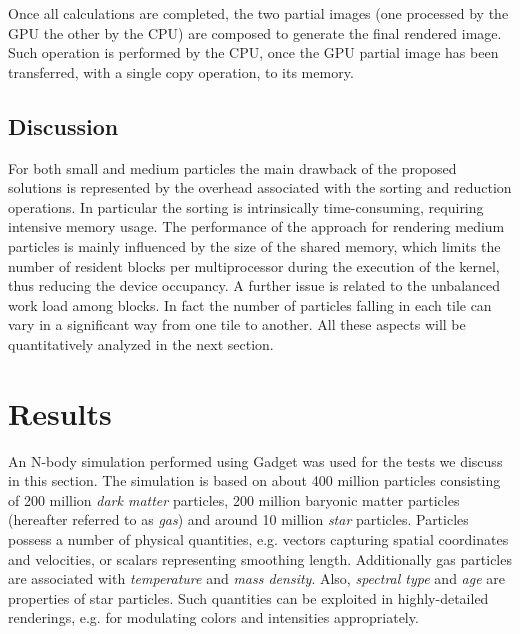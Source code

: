 \documentclass[1p]{elsarticle}
\begin{document}
Once all calculations are completed, the two partial images (one processed by the GPU the other by the CPU) are composed to generate the final rendered image. Such operation is performed by the CPU, once the GPU partial image has been transferred, with a single copy operation, to its memory. 

\subsection{Discussion}
For both small and medium particles the main drawback of the proposed solutions
is represented by the overhead associated with the sorting and reduction operations. In particular the sorting is intrinsically time-consuming, requiring intensive memory usage.
The performance of the approach for rendering medium particles is mainly influenced
by the size of the shared memory, which limits the number of resident blocks
per multiprocessor during the execution of the kernel, thus reducing the device occupancy. 
A further issue is related to the unbalanced work load among blocks. In fact the number of particles falling in each tile can vary in a significant way from one tile to another. All these aspects will be quantitatively analyzed in the next section.

\section{Results}
\label{sec:results}


An N-body simulation performed using Gadget \cite{gadgeturl} was used for the tests we discuss in this section. The simulation is based on about 400 million particles consisting of 200 million {\it dark matter} particles, 200 million baryonic matter particles (hereafter referred to as {\it gas}) and around 10 million {\it star} particles. Particles possess a number of physical quantities, e.g. vectors capturing spatial coordinates and velocities, or scalars representing smoothing length. Additionally gas particles are associated with {\it temperature} and {\it mass density}. Also, {\it spectral type} and {\it age} are properties of star particles. Such quantities can be exploited in highly-detailed renderings, e.g. for modulating colors and intensities appropriately. 
\end{document}
